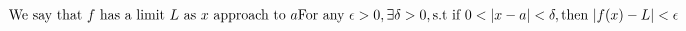 \documentclass[preview]{standalone}
\begin{document}
\begin{align*}
{\text{We say that } f \text{ has a limit } L \text{ as } x \text{ approach to } a} \centering\text{For any }\epsilon > 0, \exists \delta > 0, \text{s.t if } 0 < |x - a| < \delta, \text{then } |f(x) - L| < \epsilon
\end{align*}
\end{document}
